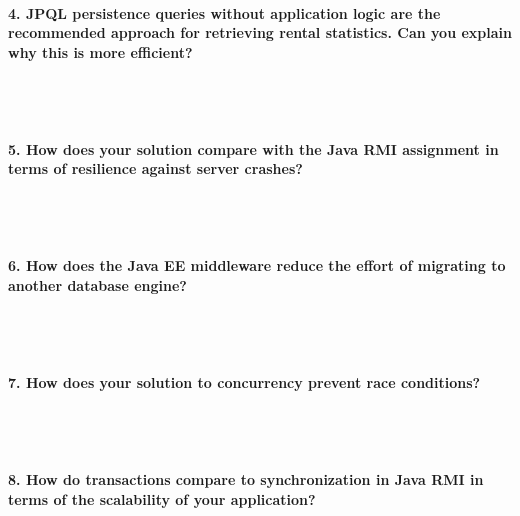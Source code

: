 \documentclass{ds-report}
\begin{document}
	\paragraph{4. JPQL persistence queries without application logic are the recommended approach for retrieving rental statistics. Can you explain why this is more efficient?} \mbox{}\\\\





	\paragraph{5. How does your solution compare with the Java RMI assignment in terms of resilience against server crashes?} \mbox{}\\\\





	\paragraph{6. How does the Java EE middleware reduce the effort of migrating to another database engine?} \mbox{}\\\\





 

	\paragraph{7. How does your solution to concurrency prevent race conditions?} \mbox{}\\\\






	\paragraph{8. How do transactions compare to synchronization in Java RMI in terms of the scalability of your application?} \mbox{}\\\\
\end{document}
